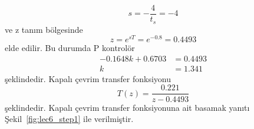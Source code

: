 \begin{equation}
    s=-\frac{4}{t_s}=-4
\end{equation}
ve z tanım bölgesinde
\begin{equation}
    z=e^{sT}=e^{-0.8}=0.4493
\end{equation}
elde edilir. Bu durumda P kontrolör
\begin{equation}
\begin{split}
    -0.1648k+0.6703&=0.4493\\
    k&=1.341
\end{split}
\end{equation}
şeklindedir. Kapalı çevrim transfer fonksiyonu
\begin{equation}
    T(z)=\frac{0.221}{z - 0.4493}
\end{equation}
şeklindedir. Kapalı çevrim transfer fonksiyonuna ait basamak yanıtı Şekil~\ref{fig:lec6_step1} ile verilmiştir.
